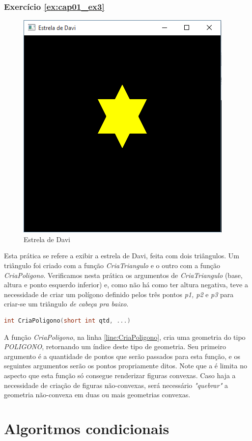 \subsection*{Exercício \ref{ex:cap01_ex3}}
\begin{figure}[ht]
  \centerline{\includegraphics[width=.5\textwidth]{img/cap1_ex2.png}}
  \caption{Estrela de Davi}
  \label{fig:cap01_ex3}
\end{figure}
Esta prática se refere a exibir a estrela de Davi, feita com dois triângulos. Um triângulo foi criado com a função \emph{CriaTriangulo} e o outro com a função \emph{CriaPoligono}. Verificamos nesta prática os argumentos de \emph{CriaTriangulo} (base, altura e ponto esquerdo inferior) e, como não há como ter altura negativa, teve a necessidade de criar um polígono definido pelos três pontos \emph{p1, p2} e \emph{p3} para criar-se um triângulo \emph{de cabeça pra baixo}.


\begin{lstlisting}[label={func:CriaPoligono},language=C++]
int CriaPoligono(short int qtd, ...)
\end{lstlisting}
A função \emph{CriaPoligono}, na linha \ref{line:CriaPoligono}, cria uma geometria do tipo \emph{POLIGONO}, retornando um índice deste tipo de geometria. Seu primeiro argumento é a quantidade de pontos que serão passados para esta função, e os seguintes argumentos serão os pontos propriamente ditos. Note que a \playAPC{} é limita no aspecto que esta função só consegue renderizar figuras convexas. Caso haja a necessidade de criação de figuras não-convexas, será necessário \emph{"quebrar"} a geometria não-convexa em duas ou mais geometrias convexas.


\chapter[Algoritmos condicionais]
{Algoritmos condicionais}



